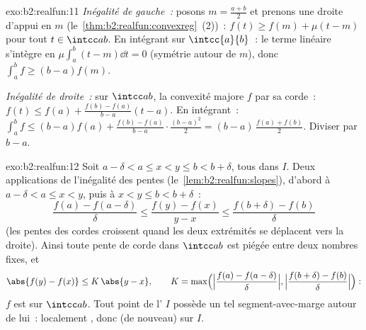 \begin{solution}{exo:b2:realfun:11}
\emph{Inégalité de gauche~:} posons $m = \frac{a+b}2$ et prenons une
droite d'appui en $m$ (le~\cref{thm:b2:realfun:convexreg}~(2))~:
$f(t) \geq f(m) + \mu(t - m)$ pour tout $t \in \intcc ab$. En
intégrant sur $\intcc{a}{b}$~: le terme linéaire s'intègre en
$\mu\int_a^b(t - m)\dd t = 0$ (symétrie autour de $m$), donc
$\int_a^b f \geq (b - a)f(m)$.

\emph{Inégalité de droite~:} sur $\intcc ab$, la convexité majore $f$
par sa corde~: $f(t) \leq f(a) + \frac{f(b) - f(a)}{b - a}(t - a)$.
En intégrant~: $\int_a^b f \leq (b-a)f(a) + \frac{f(b) - f(a)}{b -
a}\cdot\frac{(b-a)^2}2 = (b - a)\,\frac{f(a) + f(b)}2$. Diviser par
$b - a$.
\end{solution}

\begin{solution}{exo:b2:realfun:12}
Soit $a - \delta < a \leq x < y \leq b < b + \delta$, tous dans $I$.
Deux applications de l'inégalité des pentes
(le~\cref{lem:b2:realfun:slopes}), d'abord à $a - \delta < a \leq x <
y$, puis à $x < y \leq b < b + \delta$~:
\[
\frac{f(a) - f(a - \delta)}{\delta}
\leq \frac{f(y) - f(x)}{y - x}
\leq \frac{f(b + \delta) - f(b)}{\delta}
\]
(les pentes des cordes croissent quand les deux extrémités se
déplacent vers la droite). Ainsi toute pente de corde dans
$\intcc ab$ est piégée entre deux nombres fixes, et
\[
\abs{f(y) - f(x)} \leq K\,\abs{y - x},
\qquad
K = \max\Bigl(\Bigl|\frac{f(a) - f(a-\delta)}{\delta}\Bigr|,
\Bigl|\frac{f(b+\delta) - f(b)}{\delta}\Bigr|\Bigr):
\]
$f$ est  sur $\intcc ab$. Tout point de l' $I$
possède un tel segment-avec-marge autour de lui~: localement
, donc (de nouveau)  sur $I$.
\end{solution}


